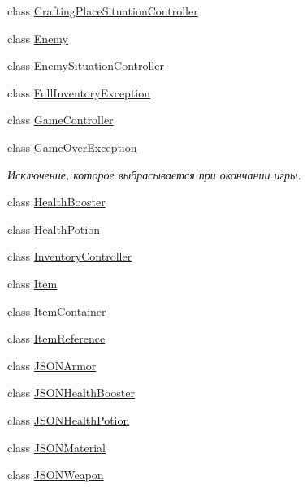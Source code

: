 \begin{DoxyCompactItemize}
\item 
class \hyperlink{class_a_s_c_i_i_wars_1_1_game_1_1_crafting_place_situation_controller}{Crafting\+Place\+Situation\+Controller}
\item 
class \hyperlink{class_a_s_c_i_i_wars_1_1_game_1_1_enemy}{Enemy}
\item 
class \hyperlink{class_a_s_c_i_i_wars_1_1_game_1_1_enemy_situation_controller}{Enemy\+Situation\+Controller}
\item 
class \hyperlink{class_a_s_c_i_i_wars_1_1_game_1_1_full_inventory_exception}{Full\+Inventory\+Exception}
\item 
class \hyperlink{class_a_s_c_i_i_wars_1_1_game_1_1_game_controller}{Game\+Controller}
\item 
class \hyperlink{class_a_s_c_i_i_wars_1_1_game_1_1_game_over_exception}{Game\+Over\+Exception}
\begin{DoxyCompactList}\small\item\em Исключение, которое выбрасывается при окончании игры. \end{DoxyCompactList}\item 
class \hyperlink{class_a_s_c_i_i_wars_1_1_game_1_1_health_booster}{Health\+Booster}
\item 
class \hyperlink{class_a_s_c_i_i_wars_1_1_game_1_1_health_potion}{Health\+Potion}
\item 
class \hyperlink{class_a_s_c_i_i_wars_1_1_game_1_1_inventory_controller}{Inventory\+Controller}
\item 
class \hyperlink{class_a_s_c_i_i_wars_1_1_game_1_1_item}{Item}
\item 
class \hyperlink{class_a_s_c_i_i_wars_1_1_game_1_1_item_container}{Item\+Container}
\item 
class \hyperlink{class_a_s_c_i_i_wars_1_1_game_1_1_item_reference}{Item\+Reference}
\item 
class \hyperlink{class_a_s_c_i_i_wars_1_1_game_1_1_j_s_o_n_armor}{J\+S\+O\+N\+Armor}
\item 
class \hyperlink{class_a_s_c_i_i_wars_1_1_game_1_1_j_s_o_n_health_booster}{J\+S\+O\+N\+Health\+Booster}
\item 
class \hyperlink{class_a_s_c_i_i_wars_1_1_game_1_1_j_s_o_n_health_potion}{J\+S\+O\+N\+Health\+Potion}
\item 
class \hyperlink{class_a_s_c_i_i_wars_1_1_game_1_1_j_s_o_n_material}{J\+S\+O\+N\+Material}
\item 
class \hyperlink{class_a_s_c_i_i_wars_1_1_game_1_1_j_s_o_n_weapon}{J\+S\+O\+N\+Weapon}
\item 

\end{DoxyCompactItemize}
